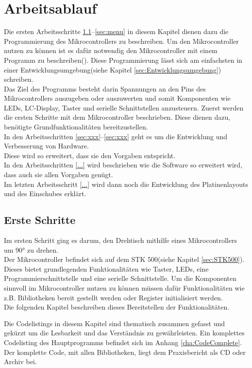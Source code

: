 \chapter{Arbeitsablauf}
\label{cha:Arbeit}
Die ersten Arbeitsschritte \ref{sec:Erste_Schritte}--\ref{sec:menu} in diesem Kapitel dienen dazu die Programmierung des Mikrocontrollers zu beschreiben. 
Um den Mikrocontroller nutzen zu können ist es dafür notwendig den Mikrocontroller mit einem Programm zu beschreiben(). 
Diese Programmierung lässt sich am einfachsten in einer Entwicklungsumgebung(siehe Kapitel \ref{sec:Entwicklungsumgebung}) schreiben.\\
Das Ziel des Programms besteht darin Spannungen an den Pins des Mikrocontrollers auszugeben oder auszuwerten und somit Komponenten wie LEDs, LC-Display, Taster und serielle Schnittstellen anzusteuern.
Zuerst werden die ersten Schritte mit dem Mikrocontroller beschrieben. Diese dienen dazu, benötigte Grundfunktionalitäten bereitzustellen.\\
In den Arbeitsschritten \ref{sec:xxx}--\ref{sec:xxx} geht es um die Entwicklung und Verbesserung von Hardware.\\
Diese wird so erweitert, dass sie den Vorgaben entspricht.\\
In den Arbeitsschritten \ref{...} wird beschrieben wie die Software so erweitert wird, dass auch sie allen Vorgaben genügt.\\
Im letzten Arbeitsschritt \ref{...} wird dann noch die Entwicklung des Platinenlayouts und des Einschubes erklärt.

\section{Erste Schritte}
\label{sec:Erste_Schritte}
Im ersten Schritt ging es darum, den Drehtisch mithilfe eines Mikrocontrollers um 90° zu drehen.\\
Der Mikrocontroller befindet sich auf dem STK 500(siehe Kapitel \ref{sec:STK500}). Dieses bietet grundlegenden Funktionalitäten wie Taster, LEDs, eine Programmierschnittstelle und eine serielle Schnittstelle.
Um die Komponenten sinnvoll im Mikrocontroller nutzen zu können müssen dafür Funktionalitäten wie z.B. Bibliotheken bereit gestellt werden oder Register initialisiert werden.\\
Die folgenden Kapitel beschreiben dieses Bereitstellen der Funktionalitäten.

\begin{Tipp}
Die Codelistings in diesem Kapitel sind thematisch zusammen gefasst und gekürzt um die Lesbarkeit
und das Verständnis zu gewährleisten. Ein komplettes Codelisting des Hauptprogramms befindet
sich im Anhang \ref{cha:CodeComplete}. Der komplette Code, mit allen Bibliotheken, liegt dem Praxisbericht
als CD oder Archiv bei.
\end{Tipp}

